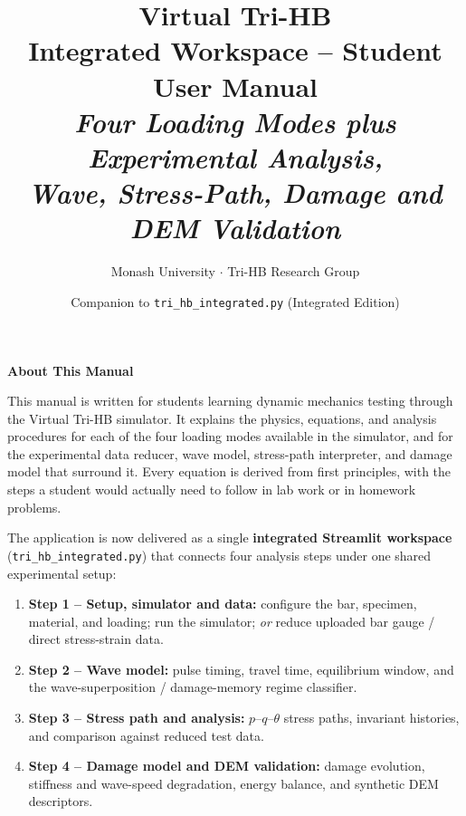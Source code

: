 \documentclass[11pt,a4paper]{article}
\title{
  \vspace{-1.5cm}
  {\Huge\bfseries\color{deepblue} Virtual Tri-HB}\\[6pt]
  {\Large\bfseries\color{midblue} Integrated Workspace -- Student User Manual}\\[14pt]
  {\large\itshape Four Loading Modes plus Experimental Analysis,\\
  Wave, Stress-Path, Damage and DEM Validation}
}
\author{
  Monash University $\cdot$ Tri-HB Research Group
}
\date{Companion to \texttt{tri\_hb\_integrated.py} (Integrated Edition)}
\begin{document}
\maketitle
\thispagestyle{empty}

\vspace{1.0cm}
\begin{center}
\begin{tcolorbox}[colback=boxgrey, colframe=midblue, width=0.88\textwidth, arc=3pt]
\begin{center}
{\large\bfseries\color{deepblue} About This Manual}\\[6pt]
\end{center}
This manual is written for students learning dynamic mechanics testing through the
Virtual Tri-HB simulator. It explains the physics, equations, and analysis
procedures for each of the four loading modes available in the simulator, and for
the experimental data reducer, wave model, stress-path interpreter, and damage
model that surround it. Every equation is derived from first principles, with the
steps a student would actually need to follow in lab work or in homework problems.

The application is now delivered as a single \textbf{integrated Streamlit
workspace} (\texttt{tri\_hb\_integrated.py}) that connects four analysis steps
under one shared experimental setup:

\begin{enumerate}[leftmargin=2.4em, itemsep=2pt]
  \item \textbf{Step 1 -- Setup, simulator and data:} configure the bar, specimen,
        material, and loading; run the simulator; \emph{or} reduce uploaded bar
        gauge / direct stress-strain data.
  \item \textbf{Step 2 -- Wave model:} pulse timing, travel time, equilibrium
        window, and the wave-superposition / damage-memory regime classifier.
  \item \textbf{Step 3 -- Stress path and analysis:} $p$--$q$--$\theta$ stress
        paths, invariant histories, and comparison against reduced test data.
  \item \textbf{Step 4 -- Damage model and DEM validation:} damage evolution,
        stiffness and wave-speed degradation, energy balance, and synthetic DEM
        descriptors.
\end{enumerate}


\end{tcolorbox}
\end{center}
\end{document}
